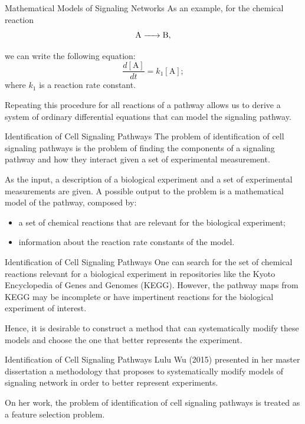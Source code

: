 \documentclass{beamer}
\begin{document}
\begin{frame}{Mathematical Models of Signaling Networks}
As an example, for the chemical reaction
\begin{equation*}
\ce{
    A -> B
},
\end{equation*}

\pause
we can write the following equation:
\begin{equation*}
        \frac{d[\text{A}]}{dt} = k_1[\text{A}]; 
\end{equation*}
where $k_1$ is a reaction rate constant.

\pause
Repeating this procedure for all reactions of a pathway allows us to 
derive a system of ordinary differential equations that can model the 
signaling pathway.
\end{frame}


\begin{frame}{Identification of Cell Signaling Pathways}
The problem of identification of cell signaling pathways is the problem
of finding the components of a signaling pathway and how they interact
given a set of experimental measurement.

\pause
As the input, a description of a biological experiment and a set of 
experimental measurements are given. A possible output to the problem is
a mathematical model of the pathway, \pause composed by:
\begin{itemize}
    \item{a set of chemical reactions that are relevant for the 
        biological experiment;}
    \pause
    \item{information about the reaction rate constants of the model.}
\end{itemize}
\end{frame}


\begin{frame}{Identification of Cell Signaling Pathways}
One can search for the set of chemical reactions relevant for a 
biological experiment in repositories like the Kyoto Encyclopedia of 
Genes and Genomes (KEGG). \pause However, the pathway maps from KEGG may
be incomplete or have impertinent reactions for the biological 
experiment of interest.
\pause

Hence, it is desirable to construct a method that can systematically 
modify these models and choose the one that better represents the 
experiment.
\end{frame}


\begin{frame}{Identification of Cell Signaling Pathways}
Lulu Wu (2015) presented in her master dissertation a methodology that 
proposes to systematically modify models of signaling network in order
to better represent experiments.
\pause

On her work, the problem of identification of cell signaling pathways is
treated as a feature selection problem.
\end{frame}
\end{document}
